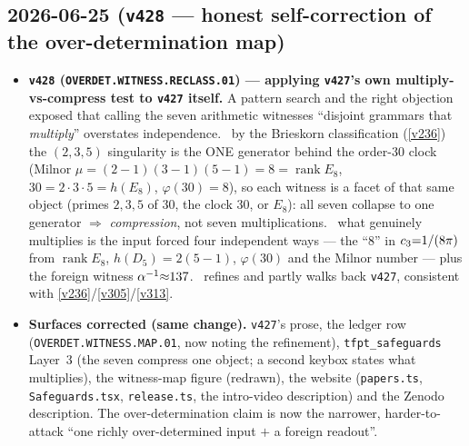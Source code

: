 \subsection*{2026-06-25 (\texttt{v428} --- honest self-correction of the over-determination map)}
\begin{itemize}
\item \textbf{\texttt{v428} (\texttt{OVERDET.WITNESS.RECLASS.01}) --- applying \texttt{v427}'s own
multiply-vs-compress test to \texttt{v427} itself.} A pattern search and the right objection exposed that
calling the seven arithmetic witnesses ``disjoint grammars that \emph{multiply}'' overstates independence.
\mE\ by the Brieskorn classification (\vref{v236}) the $(2,3,5)$ singularity is the ONE generator behind the
order-$30$ clock (Milnor $\mu{=}(2{-}1)(3{-}1)(5{-}1){=}8{=}\operatorname{rank}E_8$, $30{=}2{\cdot}3{\cdot}5
{=}h(E_8)$, $\varphi(30){=}8$), so each witness is a facet of that same object (primes $2,3,5$ of $30$, the
clock $30$, or $E_8$): all seven collapse to one generator $\Rightarrow$ \emph{compression}, not seven
multiplications. \mE\ what genuinely multiplies is the input forced four independent ways --- the ``$8$'' in
$c_3{=}1/(8\pi)$ from $\operatorname{rank}E_8$, $h(D_5){=}2(5{-}1)$, $\varphi(30)$ and the Milnor number
--- plus the foreign witness $\alpha^{-1}{\approx}137$. \mC\ refines and partly walks back \texttt{v427},
consistent with \vref{v236}/\vref{v305}/\vref{v313}.
\item \textbf{Surfaces corrected (same change).} \texttt{v427}'s prose, the ledger row
(\texttt{OVERDET.WITNESS.MAP.01}, now noting the refinement), \texttt{tfpt\_safeguards} Layer~3 (the seven
compress one object; a second keybox states what multiplies), the witness-map figure (redrawn), the website
(\texttt{papers.ts}, \texttt{Safeguards.tsx}, \texttt{release.ts}, the intro-video description) and the
Zenodo description. The over-determination claim is now the narrower, harder-to-attack ``one richly
over-determined input $+$ a foreign readout''.
\end{itemize}

